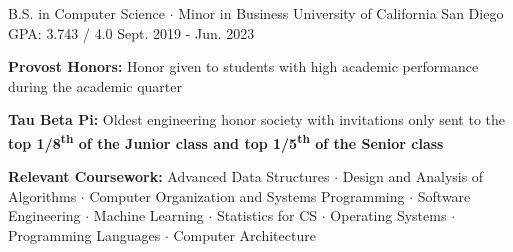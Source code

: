 

\begin{cventries}

  \cventry
    {B.S. in Computer Science $\cdot$ Minor in Business} %
    {University of California San Diego} %
    {GPA: 3.743 / 4.0} %
    {Sept. 2019 - Jun. 2023} %
    {
      \begin{cvitems} %
        \item {\textbf{Provost Honors:} Honor given to students with high academic performance during the academic quarter}
        \item {\textbf{Tau Beta Pi:} Oldest engineering honor society with invitations only sent to the \textbf{top 1/8\textsuperscript{th} of the Junior class and top 1/5\textsuperscript{th} of the Senior class}}
        \item {\textbf{Relevant Coursework:} Advanced Data Structures $\cdot$ Design and Analysis of Algorithms $\cdot$ Computer Organization and Systems Programming $\cdot$ Software Engineering $\cdot$ Machine Learning $\cdot$ Statistics for CS $\cdot$ Operating Systems $\cdot$ Programming Languages $\cdot$ Computer Architecture}
      \end{cvitems}
    }

\end{cventries}
